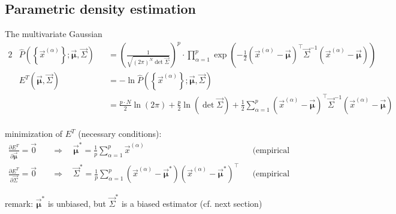 \subsection{Parametric density estimation}


\begin{frame}[t]{The multivariate Gaussian}
\smaller
\svspace{-0.8cm}
\begin{alignat*}{2}
&\widehat{P}\left(\left\{ \vec{x}^{(\alpha)} \right\}; \vec{\boldsymbol \mu}, \vec{\Sigma} \right) &&= \left( \frac{1}{\sqrt{(2\pi)^N \det \vec{\Sigma}}} \right)^p \cdot \prod_{\alpha=1}^{p} \exp \left(-\frac{1}{2} \left(\vec{x}^{(\alpha)} - \vec{\boldsymbol \mu} \right)^\top \vec{\Sigma}^{-1} \left(\vec{x}^{(\alpha)} - \vec{\boldsymbol \mu} \right) \right) \\[10pt]
&E^T\left( \vec{\boldsymbol \mu}, \vec{\Sigma} \right) &&= - \ln \widehat{P}\left(\left\{ \vec{x}^{(\alpha)} \right\}; \vec{\boldsymbol \mu}, \vec{\Sigma} \right) \\
& &&= \frac{p \cdot N}{2} \ln(2\pi) + \frac{p}{2} \ln(\det \vec{\Sigma}) + \frac{1}{2} \sum_{\alpha=1}^{p} \left(  \vec{x}^{(\alpha)} - \vec{\boldsymbol \mu} \right)^\top \vec{\Sigma}^{-1} \left(  \vec{x}^{(\alpha)} - \vec{\boldsymbol \mu} \right)
\end{alignat*}
\\\vspace{0.2cm}
minimization of $E^T$ (necessary conditions):
\vspace{-0.1cm}
\begin{align*}
\frac{\partial E^T}{\partial \vec{\boldsymbol \mu}} = \vec{0} \quad &\Rightarrow \quad \vec{\boldsymbol \mu}^* = \frac{1}{p} \sum_{\alpha=1}^{p} \vec{x}^{(\alpha)}  &&\text{(empirical average)}\\
\frac{\partial E^T}{\partial \vec{\Sigma}} = \vec{0} \quad &\Rightarrow \quad \vec{\Sigma}^* = \frac{1}{p} \sum_{\alpha=1}^{p} (\vec{x}^{(\alpha)} - \vec{\boldsymbol \mu}^*) (\vec{x}^{(\alpha)} - \vec{\boldsymbol \mu}^*)^\top &&\text{(empirical covariance matrix)}
\end{align*}

remark: $\vec{\boldsymbol \mu}^*$ is unbiased, but $\vec{\Sigma}^*$ is a biased estimator (cf. next section)

\end{frame}
